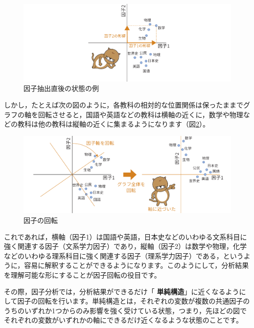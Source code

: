 \documentclass[
  12pt,
  a5jpaper,
  lualatex, ja=standard]{bxjsbook}
\renewcommand{\emph}[1]{\textbf{\color{emph} #1}}
\begin{document}
\begin{figure}[!ht]

{\centering \includegraphics[width=1\linewidth]{images/factor/efa-factor-example} 

}

\caption{因子抽出直後の状態の例}\label{fig:factor-efa-factor-example}
\end{figure}

しかし，たとえば次の図のように，各教科の相対的な位置関係は保ったままでグラフの軸を回転させると，国語や英語などの教科は横軸の近くに，数学や物理などの教科は他の教科は縦軸の近くに集まるようになります（図\ref{fig:factor-efa-factor-example2}）。

\begin{figure}[!ht]

{\centering \includegraphics[width=1\linewidth]{images/factor/efa-factor-example2} 

}

\caption{因子の回転}\label{fig:factor-efa-factor-example2}
\end{figure}

これであれば，横軸（因子1）は国語や英語，日本史などのいわゆる文系科目に強く関連する因子（文系学力因子）であり，縦軸（因子2）は数学や物理，化学などのいわゆる理系科目に強く関連する因子（理系学力因子）である，というように，容易に解釈することができるようになります。このようにして，分析結果を理解可能な形にすることが因子回転の役目です。

その際，因子分析では，分析結果ができるだけ「\emph{単純構造}」に近くなるようにして因子の回転を行います。単純構造とは，それぞれの変数が複数の共通因子のうちのいずれか1つからのみ影響を強く受けている状態，つまり，先ほどの図でそれぞれの変数がいずれかの軸にできるだけ近くなるような状態のことです。
\end{document}
